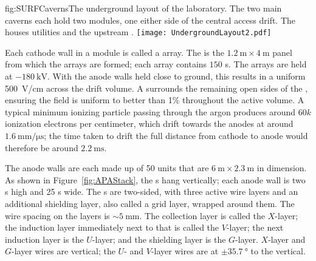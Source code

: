 \begin{dunefigure}{fig:SURFCaverns}{The underground layout of the  laboratory. The two main caverns each hold two \nominalmodsize modules, one either side of the central access drift. The  houses utilities and the upstream .}
\texttt{[image: UndergroundLayout2.pdf]}
\end{dunefigure}

Each cathode wall in a module is called a  array. The  is the $\SI{1.2}{\meter}\times\SI{4}{\meter}$ panel from which the  arrays are formed; each  array contains $150$ s. The  arrays are held at $-\SI{180}{\kilo\volt}$. With the anode walls held close to ground, this results in a uniform \SI{500}{\volt/\centi\meter} \efield across the drift volume. A  surrounds the remaining open sides of the , ensuring the field is uniform to better than 1\% throughout the active volume. A typical minimum ionizing particle passing through the argon produces around $60k$ ionization electrons per centimeter, which drift towards the anodes at around $\SI{1.6}{\mm/\micro\second}$; the time taken to drift the full distance from cathode to anode would therefore be around $\SI{2.2}{\milli\second}$.

The anode walls are each made up of 50  units that are $\SI{6}{\meter}\times\SI{2.3}{\meter}$ in dimension. As shown in Figure~\ref{fig:APAStack}, the s hang vertically; each anode wall is two s high and 25 s wide. The s are two-sided, with three active wire layers and an additional shielding layer, also called a grid layer, wrapped around them. The wire spacing on the layers is $\sim\!\SI{5}{\mm}$. The collection layer is called the $X$-layer; the induction layer immediately next to that is called the $V$-layer; the next induction layer is the $U$-layer; and the shielding layer is the $G$-layer. $X$-layer and $G$-layer wires are vertical; the $U$- and $V$-layer wires are at $\pm\SI{35.7}{\degree}$ to the vertical.


